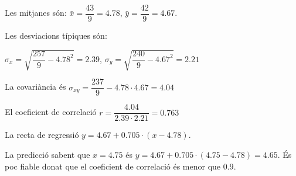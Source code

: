 \begin{resolt}[E]
Les mitjanes són: $\bar x = \dfrac{43}{9}=4.78$, $\bar y = \dfrac{42}{9}=4.67$.\vspace{0.25cm}

Les desviacions típiques són:
\begin{center}
 $\sigma_x = \sqrt{ \dfrac{257}{9} - 4.78^2}=2.39$, $\sigma_y = \sqrt{ \dfrac{240}{9} - 4.67^2}=2.21$\vspace{0.25cm}
\end{center}

La covariància és   $\sigma_{xy} = \dfrac{237}{9} -4.78 \cdot 4.67 = 4.04$ \vspace{0.25cm}

El coeficient de correlació $r = \dfrac{4.04}{2.39 \cdot 2.21}=0.763$\vspace{0.25cm}

La recta de regressió $y = 4.67 + 0.705\cdot(x-4.78)$.\vspace{0.25cm}

La predicció sabent que $x=4.75$ és  $y = 4.67 + 0.705\cdot(4.75-4.78)=4.65$. És poc fiable donat que el coeficient de correlació és menor que $0.9$. 
\end{resolt}

\pagebreak
\mbox{}

\vspace*{-2.65cm}


